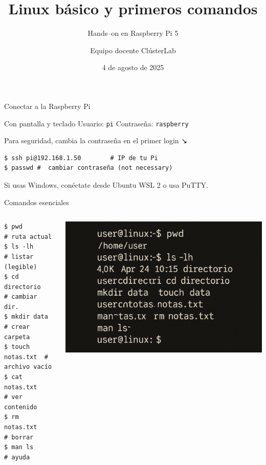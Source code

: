 \documentclass[aspectratio=169,professionalfonts]{beamer}
\title[ClústerLab • Día 1]{Linux básico y primeros comandos}
\subtitle{Hands--on en Raspberry Pi 5}
\author{Equipo docente ClústerLab}
\date{4 de agosto de 2025}
\begin{document}
\begin{frame}[plain]
  \titlepage
\end{frame}

\begin{frame}[fragile]{Conectar a la Raspberry Pi}
  \begin{block}{Con pantalla y teclado}
    Usuario: \texttt{pi} \hfill Contraseña: \texttt{raspberry}
  \end{block}
  \begin{infobox}
    Para seguridad, cambia la contraseña en el primer login ↘︎
  \end{infobox}
  \begin{verbatim}
$ ssh pi@192.168.1.50        # IP de tu Pi
$ passwd #  cambiar contraseña (not necessary)
  \end{verbatim}
  \small Si usas Windows, conéctate desde Ubuntu WSL 2 o usa PuTTY.
\end{frame}

\begin{frame}[fragile]{Comandos esenciales}
\begin{columns}[T,onlytextwidth]
\begin{verbatim}
$ pwd              # ruta actual
$ ls -lh           # listar (legible)
$ cd directorio    # cambiar dir.
$ mkdir data       # crear carpeta
$ touch notas.txt  # archivo vacío
$ cat notas.txt    # ver contenido
$ rm notas.txt     # borrar
$ man ls           # ayuda
\end{verbatim}

\centering
\includegraphics[width=\linewidth]{simple_term.png}
\end{columns}
\end{frame}
\end{document}
